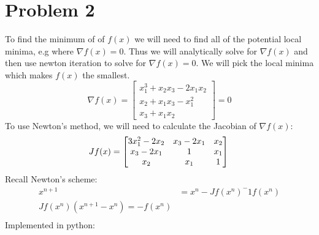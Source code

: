\documentclass{article}
\begin{document}
\section*{Problem 2}
To find the minimum of of $f(x)$ we will need to find all of the potential local minima, e.g where $\nabla f(x) = 0$. Thus we will analytically solve for $\nabla f(x)$ and then use newton iteration to solve for $\nabla f(x) = 0$. We will pick the local minima which makes $f(x)$ the smallest.\\
\[
\nabla f(x) = \begin{bmatrix}
x_1^3 + x_2x_3 - 2x_1x_2 \\
x_2 + x_1x_3 - x_1^2 \\
x_3 + x_1x_2
\end{bmatrix}  =0 \] 
To use Newton's method, we will need to calculate the Jacobian of $\nabla f(x)$: \\
\[
J f(x) = \begin{bmatrix}
3x_1^2 - 2x_2 & x_3 - 2x_1 & x_2 \\
x_3 - 2x_1 & 1 & x_1 \\
x_2 & x_1 & 1
\end{bmatrix} \\
\]
Recall Newton's scheme: \\
\begin{align*}
x^{n+1} &= x^n - Jf(x^n)^-1f(x^n) \\
Jf(x^n)(x^{n+1} - x^n) = -f(x^n) \\
\end{align*}
Implemented in python: \\
\end{document}
